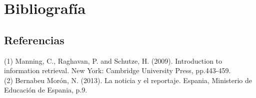 

\chapter{Bibliografía}\label{chp:introduccion}

\section{Referencias}

(1) Manning, C., Raghavan, P. and Schutze, H. (2009). Introduction to information retrieval. New York: Cambridge University Press, pp.443-459.\\

(2) Bernabeu Morón, N. (2013). La noticia y el reportaje. Espania, Ministerio de Educación de Espania, p.9.
